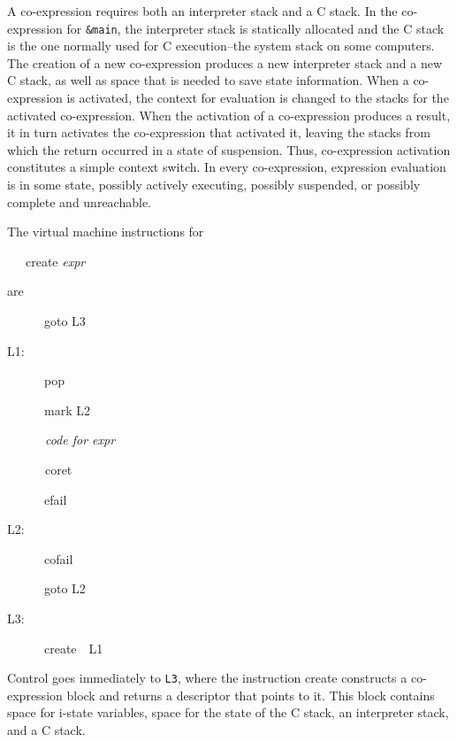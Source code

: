 A co-expression requires both an interpreter stack and a C stack. In
the co-expression for \texttt{\&main}, the interpreter stack is
statically allocated and the C stack is the one normally used for C
execution--the {\textquotedbl}system stack{\textquotedbl} on some
computers. The creation of a new co-expression produces a new
interpreter stack and a new C stack, as well as space that is needed
to save state information. When a co-expression is activated, the
context for evaluation is changed to the stacks for the activated
co-expression. When the activation of a co-expression produces a
result, it in turn activates the co-expression that activated it,
leaving the stacks from which the return occurred in a state of
suspension. Thus, co-expression activation constitutes a simple
context switch.  In every co-expression, expression evaluation is in
some state, possibly actively executing, possibly suspended, or
possibly complete and unreachable.


The virtual machine instructions for

{\ttfamily\mdseries
\ \ \ create \textit{expr}}

are

{\ttfamily\mdseries
\ \ \ \ \ \ goto L3}

{\ttfamily\mdseries
L1:}

{\ttfamily\mdseries
\ \ \ \ \ \ pop}

{\ttfamily\mdseries
\ \ \ \ \ \ mark L2}

{\ttfamily\itshape
\ \ \ \ \ \ code for expr}

{\ttfamily\mdseries
\textrm{\textit{\ \ \ \ \ \ }}\textrm{coret}}

{\ttfamily\mdseries
\ \ \ \ \ \ efail}

{\ttfamily\mdseries
L2:}

{\ttfamily\mdseries
\ \ \ \ \ \ cofail}

{\ttfamily\mdseries
\ \ \ \ \ \ goto L2}

{\ttfamily\mdseries
L3:}

{\ttfamily\mdseries
\ \ \ \ \ \ create\ \ L1}


Control goes immediately to \texttt{L3}, where the instruction create
constructs a co-expression block and returns a descriptor that points
to it. This block contains space for i-state variables, space for the
state of the C stack, an interpreter stack, and a C stack.

